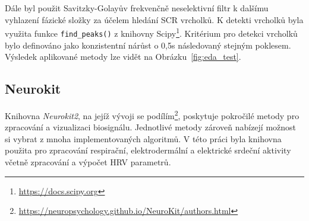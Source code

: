 Dále byl použit Savitzky-Golayův frekvenčně neselektivní filtr k dalšímu
vyhlazení fázické složky za účelem hledání \gls{SCR} vrcholků. K detekti
vrcholků byla využita funkce \texttt{find\_peaks()} z knihovny
Scipy\footnote{\url{https://docs.scipy.org}}. Kritérium pro detekci vrcholků
bylo definováno jako konzistentní nárůst o 0,5s následovaný stejným poklesem.
Výsledek aplikované metody lze vidět na Obrázku~\ref{fig:eda_test}.

\subsection*{Neurokit}
\label{subsec:neurokit}
Knihovna \textit{Neurokit2}, na jejíž vývoji se
podílím\footnote{\url{https://neuropsychology.github.io/NeuroKit/authors.html}}, poskytuje
pokročilé metody pro zpracování a vizualizaci biosignálu. Jednotlivé metody
zároveň nabízejí možnost si vybrat z mnoha implementovaných algoritmů. V této
práci byla knihovna použita pro zpracování respirační, elektrodermální a
elektrické srdeční aktivity včetně zpracování a výpočet \gls{HRV} parametrů.
